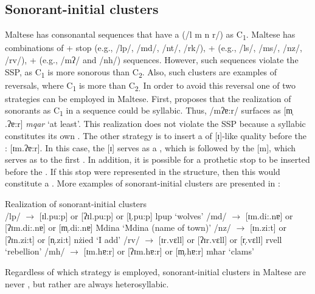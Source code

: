 \documentclass[output=paper]{langsci/langscibook}
\begin{document}
\subsection{Sonorant-initial clusters}
Maltese has consonantal sequences that have a  (/l m n r/) as C\textsubscript{1}. Maltese has combinations of  + stop (e.g., /lp/, /md/, /nt/, /rk/),  +  (e.g., /ls/, /ms/, /nz/, /rv/),  +  (e.g., /mʔ/ and /nh/) sequences. However, such sequences violate the SSP, as C\textsubscript{1} is more sonorous than C\textsubscript{2}. Also, such clusters are examples of  reversals, where C\textsubscript{1} is more  than C\textsubscript{2.} In order to avoid this  reversal one of two strategies can be employed in Maltese. First, \citet{azzopardi1981phonetics} proposes that the realization of sonorants as C\textsubscript{1} in a  sequence could be syllabic. Thus, /mʔɐ:r/ surfaces as [m̩ .ʔɐ:r] \textit{mqar} ‘at least’. This realization does not violate the SSP because a syllabic  constitutes its own . The other strategy is to insert a  of [ɪ]-like quality before the  : [ɪm.ʔɐ:r]. In this case, the  [ɪ] serves as a , which is followed by the  [m], which serves as  to the first . In addition, it is possible for a prothetic  stop to be inserted before the . If this  stop were represented in the  structure, then this would constitute a . More examples of sonorant-initial clusters are presented in :

\ea\label{ex:galea:6}
{Realization of sonorant-initial clusters}\\
\ea /lp/ $\rightarrow$ [ɪl.pu:p] or [ʔɪl.pu:p] or [l̩.pu:p] lpup ‘wolves’
\ex /md/ $\rightarrow$ [ɪm.di:.nɐ] or [ʔɪm.di:.nɐ] or [m̩.di:.nɐ] Mdina ‘Mdina (name of town)’
\ex /nz/ $\rightarrow$ [ɪn.zi:t] or [ʔɪn.zi:t] or [n̩.zi:t] nżied ‘I add’
\ex /rv/ $\rightarrow$ [ɪr.vɛll] or [ʔɪr.vɛll] or [r̩.vɛll] rvell ‘rebellion’
\ex /mh/ $\rightarrow$ [ɪm.hɐ:r] or [ʔɪm.hɐ:r] or [m̩.hɐ:r] mħar ‘clams’ 
\z
\z

Regardless of which strategy is employed, sonorant-initial clusters in Maltese are never , but rather are always heterosyllabic. 
\end{document}
